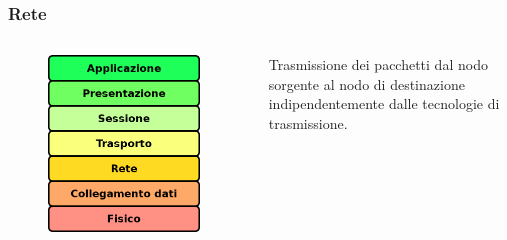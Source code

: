 \documentclass{beamer}
\begin{document}
\subsubsection*{Rete}
\begin{frame}{\insertsection}{\insertsubsection}
\begin{columns}
\begin{figure}
\includegraphics[width=0.95\textwidth]{imgs/01-iso-osi.drawio.png}
\end{figure}
\begin{block}{\insertsubsubsection}
Trasmissione dei pacchetti dal nodo sorgente al nodo di destinazione
indipendentemente dalle tecnologie di trasmissione.
\end{block}
\end{columns}
\end{frame}
\end{document}

